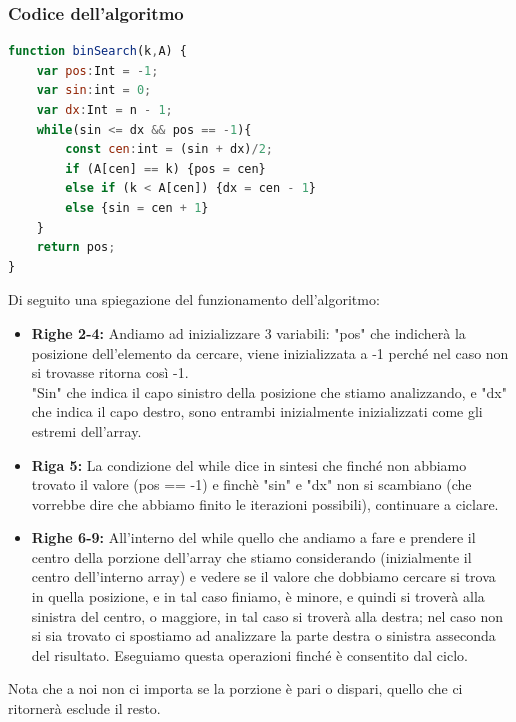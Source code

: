 \subsubsection{Codice dell'algoritmo}
\begin{lstlisting}[language=Javascript, caption=Codice BinarySearch]
function binSearch(k,A) {
    var pos:Int = -1;
    var sin:int = 0;
    var dx:Int = n - 1;
    while(sin <= dx && pos == -1){
        const cen:int = (sin + dx)/2;
        if (A[cen] == k) {pos = cen}
        else if (k < A[cen]) {dx = cen - 1}
        else {sin = cen + 1}
    }
    return pos;
}
\end{lstlisting}
Di seguito una spiegazione del funzionamento dell'algoritmo:
\begin{itemize}
    \item \textbf{Righe 2-4:} Andiamo ad inizializzare 3 variabili: "pos" che indicherà la posizione dell'elemento da cercare, viene inizializzata a -1 perché nel caso non si trovasse ritorna così -1. \\
    "Sin" che indica il capo sinistro della posizione che stiamo analizzando, e "dx" che indica il capo destro, sono entrambi inizialmente inizializzati come gli estremi dell'array.
    \item \textbf{Riga 5:} La condizione del while dice in sintesi che finché non abbiamo trovato il valore (pos == -1) e finchè "sin" e "dx" non si scambiano (che vorrebbe dire che abbiamo finito le iterazioni possibili), continuare a ciclare.
    \item \textbf{Righe 6-9:} All'interno del while quello che andiamo a fare e prendere il centro della porzione dell'array che stiamo considerando (inizialmente il centro dell'interno array) e vedere se il valore che dobbiamo cercare si trova in quella posizione, e in tal caso finiamo, è minore, e quindi si troverà alla sinistra del centro, o maggiore, in tal caso si troverà alla destra; nel caso non si sia trovato ci spostiamo ad analizzare la parte destra o sinistra asseconda del risultato. Eseguiamo questa operazioni finché è consentito dal ciclo.
\end{itemize}
\begin{note}
Nota che a noi non ci importa se la porzione è pari o dispari, quello che ci ritornerà esclude il resto.
\end{note}
